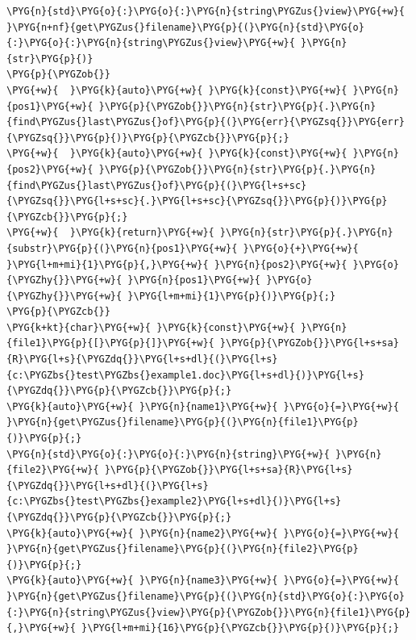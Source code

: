 
\begin{codeblockbg}
\begin{Verbatim}[commandchars=\\\{\},breaklines=true,breakanywhere=true,fontsize=\codefont,xleftmargin=17bp]
\PYG{n}{std}\PYG{o}{:}\PYG{o}{:}\PYG{n}{string\PYGZus{}view}\PYG{+w}{ }\PYG{n+nf}{get\PYGZus{}filename}\PYG{p}{(}\PYG{n}{std}\PYG{o}{:}\PYG{o}{:}\PYG{n}{string\PYGZus{}view}\PYG{+w}{ }\PYG{n}{str}\PYG{p}{)}
\PYG{p}{\PYGZob{}}
\PYG{+w}{  }\PYG{k}{auto}\PYG{+w}{ }\PYG{k}{const}\PYG{+w}{ }\PYG{n}{pos1}\PYG{+w}{ }\PYG{p}{\PYGZob{}}\PYG{n}{str}\PYG{p}{.}\PYG{n}{find\PYGZus{}last\PYGZus{}of}\PYG{p}{(}\PYG{err}{\PYGZsq{}}\PYG{err}{\PYGZsq{}}\PYG{p}{)}\PYG{p}{\PYGZcb{}}\PYG{p}{;}
\PYG{+w}{  }\PYG{k}{auto}\PYG{+w}{ }\PYG{k}{const}\PYG{+w}{ }\PYG{n}{pos2}\PYG{+w}{ }\PYG{p}{\PYGZob{}}\PYG{n}{str}\PYG{p}{.}\PYG{n}{find\PYGZus{}last\PYGZus{}of}\PYG{p}{(}\PYG{l+s+sc}{\PYGZsq{}}\PYG{l+s+sc}{.}\PYG{l+s+sc}{\PYGZsq{}}\PYG{p}{)}\PYG{p}{\PYGZcb{}}\PYG{p}{;}
\PYG{+w}{  }\PYG{k}{return}\PYG{+w}{ }\PYG{n}{str}\PYG{p}{.}\PYG{n}{substr}\PYG{p}{(}\PYG{n}{pos1}\PYG{+w}{ }\PYG{o}{+}\PYG{+w}{ }\PYG{l+m+mi}{1}\PYG{p}{,}\PYG{+w}{ }\PYG{n}{pos2}\PYG{+w}{ }\PYG{o}{\PYGZhy{}}\PYG{+w}{ }\PYG{n}{pos1}\PYG{+w}{ }\PYG{o}{\PYGZhy{}}\PYG{+w}{ }\PYG{l+m+mi}{1}\PYG{p}{)}\PYG{p}{;}
\PYG{p}{\PYGZcb{}}
\PYG{k+kt}{char}\PYG{+w}{ }\PYG{k}{const}\PYG{+w}{ }\PYG{n}{file1}\PYG{p}{[}\PYG{p}{]}\PYG{+w}{ }\PYG{p}{\PYGZob{}}\PYG{l+s+sa}{R}\PYG{l+s}{\PYGZdq{}}\PYG{l+s+dl}{(}\PYG{l+s}{c:\PYGZbs{}test\PYGZbs{}example1.doc}\PYG{l+s+dl}{)}\PYG{l+s}{\PYGZdq{}}\PYG{p}{\PYGZcb{}}\PYG{p}{;}
\PYG{k}{auto}\PYG{+w}{ }\PYG{n}{name1}\PYG{+w}{ }\PYG{o}{=}\PYG{+w}{ }\PYG{n}{get\PYGZus{}filename}\PYG{p}{(}\PYG{n}{file1}\PYG{p}{)}\PYG{p}{;}
\PYG{n}{std}\PYG{o}{:}\PYG{o}{:}\PYG{n}{string}\PYG{+w}{ }\PYG{n}{file2}\PYG{+w}{ }\PYG{p}{\PYGZob{}}\PYG{l+s+sa}{R}\PYG{l+s}{\PYGZdq{}}\PYG{l+s+dl}{(}\PYG{l+s}{c:\PYGZbs{}test\PYGZbs{}example2}\PYG{l+s+dl}{)}\PYG{l+s}{\PYGZdq{}}\PYG{p}{\PYGZcb{}}\PYG{p}{;}
\PYG{k}{auto}\PYG{+w}{ }\PYG{n}{name2}\PYG{+w}{ }\PYG{o}{=}\PYG{+w}{ }\PYG{n}{get\PYGZus{}filename}\PYG{p}{(}\PYG{n}{file2}\PYG{p}{)}\PYG{p}{;}
\PYG{k}{auto}\PYG{+w}{ }\PYG{n}{name3}\PYG{+w}{ }\PYG{o}{=}\PYG{+w}{ }\PYG{n}{get\PYGZus{}filename}\PYG{p}{(}\PYG{n}{std}\PYG{o}{:}\PYG{o}{:}\PYG{n}{string\PYGZus{}view}\PYG{p}{\PYGZob{}}\PYG{n}{file1}\PYG{p}{,}\PYG{+w}{ }\PYG{l+m+mi}{16}\PYG{p}{\PYGZcb{}}\PYG{p}{)}\PYG{p}{;}
\end{Verbatim}
\end{codeblockbg}


